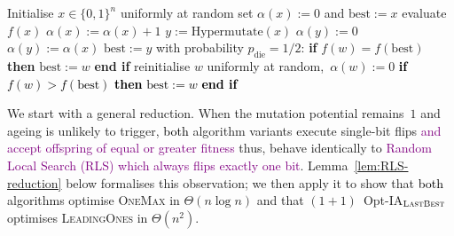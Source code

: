\documentclass[lettersize,journal]{IEEEtran}
\newcommand{\new}[1]{\textcolor{black}{#1}}
\newcommand{\rev}[1]{\textcolor{black}{#1}}
\newcommand{\rerev}[1]{\textcolor{purple}{#1}}
\newcommand{\lastBest}{$(1+1)$~Opt-IA$_{\textsc{LastBest}}$}
\begin{document}
\begin{algorithm}[t] 
 		\caption{$(1+1)$~Opt-IA$_{\textsc{FirstBest}}$ }
 		\begin{algorithmic}[1] \STATE Initialise $x \in\{0,1\}^n$ uniformly at random \STATE set $\alpha(x):=0$ and $\text{best}:=x$      
 			\STATE evaluate $f(x)$    
 			 \STATE $\alpha(x):=\alpha(x)+1$
 			\STATE $y:=\text{Hypermutate}(x)$
 			\STATE $\alpha(y):=0$
 			\ELSE
 			\STATE $\alpha(y):=\alpha(x)$
 			\ENDIF
 			\STATE $\text{best}:=y$
 			\ENDIF
 			\STATE with probability $p_{\text{die}}=1/2$:
 			\STATE \hspace{\algorithmicindent}
 			\textbf{if} $f(w) = f(\text{best})$ \textbf{then}
 			\STATE \hspace{2\algorithmicindent}
 			$\text{best}:=w$
 			\STATE \hspace{\algorithmicindent}
 			\textbf{end if}
 			\STATE \hspace{\algorithmicindent}
 			reinitialise $w$ uniformly at random,\ $\alpha(w):=0$
 			\textcolor{black}{\STATE \hspace{\algorithmicindent}
 				\textbf{if} $f(w) > f(\text{best})$ \textbf{then}
 				\STATE \hspace{2\algorithmicindent}
 				$\text{best}:=w$
 				\STATE \hspace{\algorithmicindent}
 				\textbf{end if}}
 			\ENDIF
 			\ENDFOR
\rev{ 
\ENDIF}
 			\ENDWHILE
 		\end{algorithmic} 
 		\label{alg:alg2+ageing}
 	\end{algorithm}












We start with a general reduction.  When the mutation potential remains~$1$
and ageing is unlikely to trigger, \new{both} algorithm variants execute
single-bit flips \rerev{and accept offspring of equal or greater fitness} thus, behave identically to \rerev{Random Local Search (RLS) which always flips exactly one bit}.
Lemma~\ref{lem:RLS-reduction} below formalises this observation;
we then apply it to show that \new{both} algorithms optimise
\textsc{OneMax} in $\Theta(n\log n)$ and that \lastBest{} optimises
\textsc{LeadingOnes} in $\Theta(n^2)$.
\end{document}
